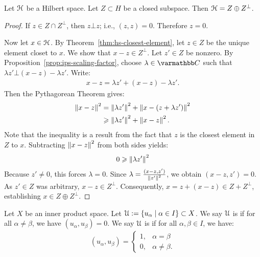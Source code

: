 \begin{theorem}
    Let $\mathcal{H}$ be a Hilbert space. Let $Z \subset H$ be a closed subspace. Then $\mathcal{H} = Z \oplus Z^\perp$.
\end{theorem}
    \begin{proof}
        If $z \in Z \cap Z^\perp$, then $z \bot z$; i.e., $(z,z) = 0$. Therefore $z = 0$.

        Now let $x \in \mathcal{H}$. By Theorem~\ref{thm:hs-closest-element}, let $z \in Z$ be the unique element closet to $x$. We show that $x - z \in Z^\perp$. Let $z' \in Z$ be nonzero. By Proposition~\ref{prop:ips-scaling-factor}, choose $\lambda \in \bfC$ such that $\lambda z' \bot (x-z) - \lambda z'$. Write:
            \begin{equation*}
            \begin{split}
                x - z = \lambda z' + (x-z) - \lambda z'.
            \end{split}
            \end{equation*}
        Then the Pythagorean Theorem gives:
            \begin{equation*}
            \begin{split}
                \left\lVert x-z \right\rVert^2 
                & = \left\lVert \lambda z' \right\rVert^2 + \left\lVert x-(z+ \lambda z') \right\rVert^2 \\
                & \geqslant \left\lVert \lambda z' \right\rVert^2 + \left\lVert x-z \right\rVert^2.
            \end{split}
            \end{equation*}
        Note that the inequality is a result from the fact that $z$ is the closest element in $Z$ to $x$. Subtracting $\left\lVert x-z \right\rVert^2$ from both sides yields:
            \begin{equation*}
            \begin{split}
                0 \geqslant \left\lVert \lambda z' \right\rVert^2
            \end{split}
            \end{equation*}
        Because $z' \neq 0$, this forces $\lambda = 0$. Since $\lambda = \frac{(x-z,z')}{\left\lVert z' \right\rVert^2}$, we obtain $(x-z,z') = 0$. As $z' \in Z$ was arbitrary, $x-z \in Z^\perp$. Consequently, $x = z + (x-z) \in Z + Z^\perp$, establishing $x \in Z \oplus Z^\perp$.
    \end{proof}

\begin{definition}
    Let $X$ be an inner product space. Let $\mathcal{U} := \{u_\alpha \mid \alpha \in I\} \subset X$. We say $\mathcal{U}$ is  if for all $\alpha \neq \beta$, we have $(u_\alpha, u_\beta) = 0$. We say $\mathcal{U}$ is  if for all $\alpha,\beta \in I$, we have:
        \begin{equation*}
        \begin{split}
            (u_\alpha,u_\beta)=
            \begin{cases}
            1, & \alpha = \beta \\
            0, & \alpha \neq \beta.
            \end{cases}
        \end{split}
        \end{equation*}
\end{definition}

